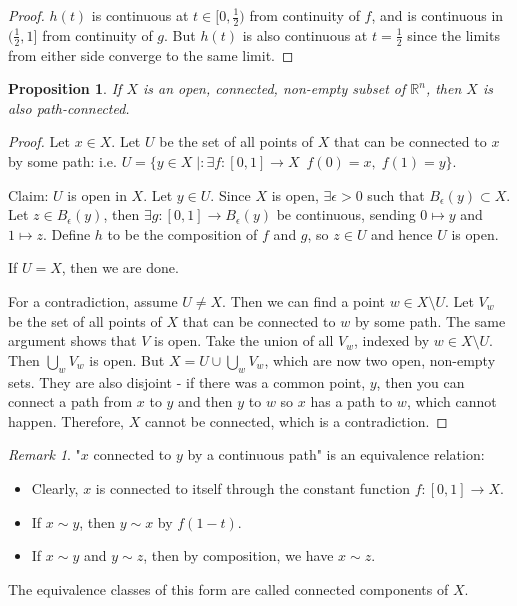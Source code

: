 \documentclass{article}
\theoremstyle{definition}
\theoremstyle{plain}%
\newtheorem{prop}[thm]{Proposition}
\theoremstyle{remark}
\newtheorem*{rem}{Remark}
\newcommand{\union}{\cup}
\newcommand{\Union}{\bigcup}
\newcommand{\R}{\mathbb{R}}
\begin{document}
\begin{proof}
    $h(t)$ is continuous at $t \in [0,\frac{1}{2})$ from continuity of $f$, and is continuous in $(\frac{1}{2}, 1]$ from continuity of $g$. But $h(t)$ is also continuous at $t = \frac{1}{2}$ since the limits from either side converge to the same limit.
\end{proof}

\begin{prop}
    If $X$ is an open, connected, non-empty subset of $\R^n$, then $X$ is also path-connected.
\end{prop}

\begin{proof}
    Let $x \in X$. Let $U$ be the set of all points of $X$ that can be connected to $x$ by some path: i.e. $U = \{y \in X \; | : \exists f : [0,1] \to X\ \; f(0) = x, \; f(1) = y \}$.
    
    Claim: $U$ is open in $X$. Let $y \in U$. Since $X$ is open, $\exists \epsilon > 0$ such that $B_\epsilon (y) \subset X$. Let $z \in B_\epsilon (y)$, then $\exists g : [0,1] \to B_\epsilon (y)$ be continuous, sending $0 \mapsto y$ and $1 \mapsto z$. Define $h$ to be the composition of $f$ and $g$, so $z \in U$ and hence $U$ is open.
    
    If $U = X$, then we are done.
    
    For a contradiction, assume $U \ne X$. Then we can find a point $w \in X \setminus U$. Let $V_w$ be the set of all points of $X$ that can be connected to $w$ by some path. The same argument shows that $V$ is open. Take the union of all $V_w$, indexed by $w \in X \setminus U$. Then $\Union_w V_w$ is open. But $X = U \union \Union_w V_w$, which are now two open, non-empty sets. They are also disjoint - if there was a common point, $y$, then you can connect a path from $x$ to $y$ and then $y$ to $w$ so $x$ has a path to $w$, which cannot happen. Therefore, $X$ cannot be connected, which is a contradiction.
\end{proof}

\begin{rem}
    "$x$ connected to $y$ by a continuous path" is an equivalence relation:
    \begin{itemize}
        \item Clearly, $x$ is connected to itself through the constant function $f : [0,1] \to X$.
        \item If $x \sim y$, then $y \sim x$ by $f(1-t)$.
        \item If $x \sim y$ and $y \sim z$, then by composition, we have $x \sim z$.
    \end{itemize}
    
    The equivalence classes of this form are called connected components of $X$.
\end{rem}
\end{document}

